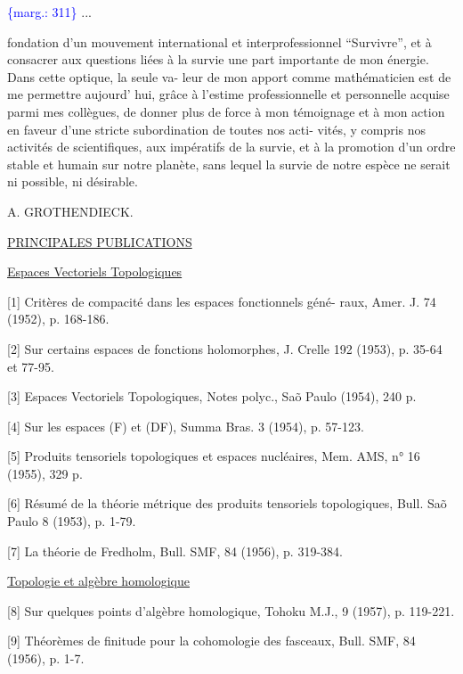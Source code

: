 \documentclass[11pt]{article}
\newcommand{\scanpage}[1]{\par\bigskip\noindent{\small\sffamily[scan #1]}\par}
\newcommand{\mspage}[1]{{\small\sffamily[p.\,#1]}}
\newcommand{\margin}[1]{\textcolor{blue}{\{\textsf{marg.:} #1\}}}
\newcommand{\uline}[1]{\underline{#1}}
\begin{document}
\margin{311} \hfill ...

\clearpage
\scanpage{119/312}
\mspage{-3-}

fondation d'un mouvement international et interprofessionnel
``Survivre'', et à consacrer aux questions liées à la survie une
part importante de mon énergie. Dans cette optique, la seule va-%
leur de mon apport comme mathématicien est de me permettre aujourd'
hui, grâce à l'estime professionnelle et personnelle acquise parmi
mes collègues, de donner plus de force à mon témoignage et à mon
action en faveur d'une stricte subordination de toutes nos acti-%
vités, y compris nos activités de scientifiques, aux impératifs
de la survie, et à la promotion d'un ordre stable et humain sur
notre planète, sans lequel la survie de notre espèce ne serait
ni possible, ni désirable.

A. GROTHENDIECK.

\uline{PRINCIPALES PUBLICATIONS}

\uline{Espaces Vectoriels Topologiques}

[1] Critères de compacité dans les espaces fonctionnels géné-%
raux, Amer. J. 74 (1952), p. 168-186.

[2] Sur certains espaces de fonctions holomorphes, J. Crelle
192 (1953), p. 35-64 et 77-95.

[3] Espaces Vectoriels Topologiques, Notes polyc., Saõ Paulo
(1954), 240 p.

[4] Sur les espaces (F) et (DF), Summa Bras. 3 (1954),
p. 57-123.

[5] Produits tensoriels topologiques et espaces nucléaires,
Mem. AMS, n° 16 (1955), 329 p.

[6] Résumé de la théorie métrique des produits tensoriels
topologiques, Bull. Saõ Paulo 8 (1953), p. 1-79.

[7] La théorie de Fredholm, Bull. SMF, 84 (1956), p. 319-384.

\uline{Topologie et algèbre homologique}

[8] Sur quelques points d'algèbre homologique, Tohoku M.J.,
9 (1957), p. 119-221.

[9] Théorèmes de finitude pour la cohomologie des fasceaux,
Bull. SMF, 84 (1956), p. 1-7.
\end{document}
